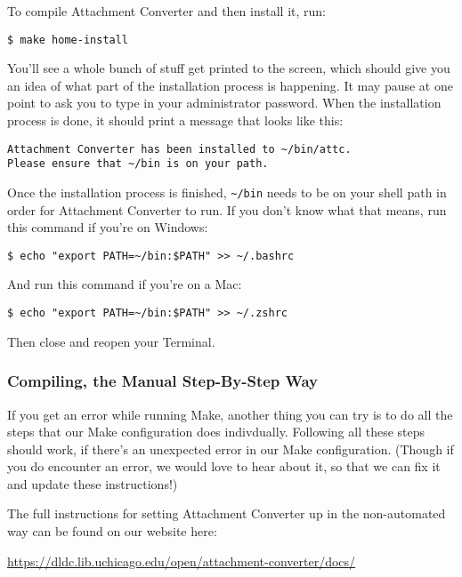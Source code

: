 \documentclass[11pt]{article}
\begin{document}
To compile Attachment Converter and then install it, run:

\begin{verbatim}
$ make home-install
\end{verbatim}

You'll see a whole bunch of stuff get printed to the screen, which
should give you an idea of what part of the installation process is
happening.  It may pause at one point to ask you to type in your
administrator password.  When the installation process is done, it
should print a message that looks like this:

\begin{verbatim}
Attachment Converter has been installed to ~/bin/attc.
Please ensure that ~/bin is on your path.
\end{verbatim}

Once the installation process is finished, \texttt{\textasciitilde{}/bin} needs to be on your
shell path in order for Attachment Converter to run.  If you don't
know what that means, run this command if you're on Windows:

\begin{verbatim}
$ echo "export PATH=~/bin:$PATH" >> ~/.bashrc
\end{verbatim}

And run this command if you're on a Mac:

\begin{verbatim}
$ echo "export PATH=~/bin:$PATH" >> ~/.zshrc
\end{verbatim}

Then close and reopen your Terminal.

\subsubsection{Compiling, the Manual Step-By-Step Way}
\label{sec:org15417cf}

If you get an error while running Make, another thing you can try is
to do all the steps that our Make configuration does indivdually.
Following all these steps should work, if there's an unexpected error
in our Make configuration.  (Though if you do encounter an error, we
would love to hear about it, so that we can fix it and update these
instructions!)

The full instructions for setting Attachment Converter up in the
non-automated way can be found on our website here:

\url{https://dldc.lib.uchicago.edu/open/attachment-converter/docs/}
\end{document}
